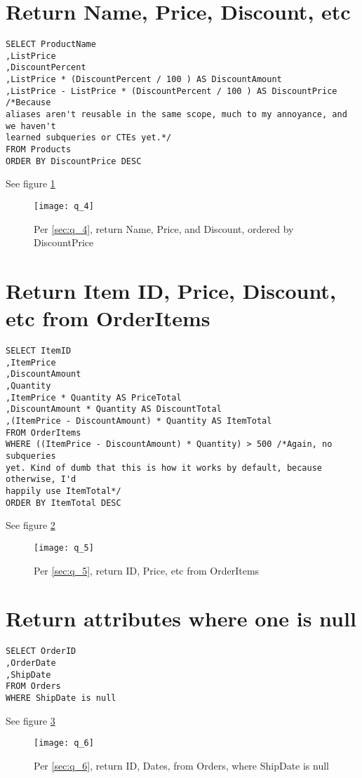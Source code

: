 \documentclass{article}
\begin{document}
\section{Return Name, Price, Discount, etc}

\begin{lstlisting}
SELECT ProductName
,ListPrice
,DiscountPercent
,ListPrice * (DiscountPercent / 100 ) AS DiscountAmount
,ListPrice - ListPrice * (DiscountPercent / 100 ) AS DiscountPrice /*Because
aliases aren't reusable in the same scope, much to my annoyance, and we haven't
learned subqueries or CTEs yet.*/
FROM Products
ORDER BY DiscountPrice DESC
\end{lstlisting}\label{sec:q_4}
See figure \ref{fig:q_4}

\begin{figure}[H]\centering
	\caption{Per \ref{sec:q_4}, return Name, Price, and Discount, ordered
	by DiscountPrice}
	\texttt{[image: q\_4]}
	\label{fig:q_4}
\end{figure}

\section{Return Item ID, Price, Discount, etc from OrderItems}

\begin{lstlisting}
SELECT ItemID
,ItemPrice
,DiscountAmount
,Quantity
,ItemPrice * Quantity AS PriceTotal
,DiscountAmount * Quantity AS DiscountTotal
,(ItemPrice - DiscountAmount) * Quantity AS ItemTotal
FROM OrderItems
WHERE ((ItemPrice - DiscountAmount) * Quantity) > 500 /*Again, no subqueries
yet. Kind of dumb that this is how it works by default, because otherwise, I'd
happily use ItemTotal*/
ORDER BY ItemTotal DESC
\end{lstlisting}\label{sec:q_5}
See figure \ref{fig:q_5}

\begin{figure}[H]\centering
	\caption{Per \ref{sec:q_5}, return ID, Price, etc from OrderItems}
	\texttt{[image: q\_5]}
	\label{fig:q_5}
\end{figure}

\section{Return attributes where one is null}

\begin{lstlisting}
SELECT OrderID
,OrderDate
,ShipDate
FROM Orders
WHERE ShipDate is null
\end{lstlisting}\label{sec:q_6}
See figure \ref{fig:q_6}

\begin{figure}[H]\centering
	\caption{Per \ref{sec:q_6}, return ID, Dates, from Orders, where
	ShipDate is null}
	\texttt{[image: q\_6]}
	\label{fig:q_6}
\end{figure}
\end{document}
